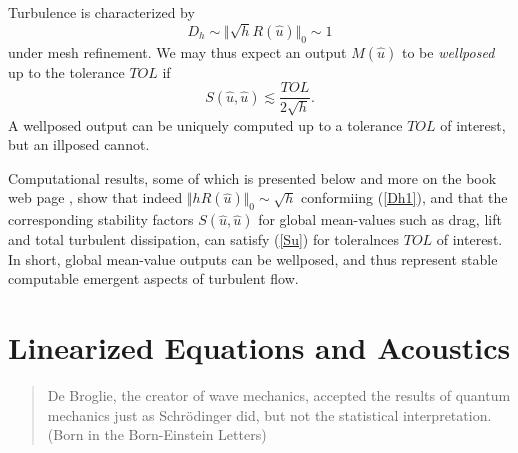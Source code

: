 Turbulence is characterized  by 
\begin{equation}\label{Dh1}
D_h\sim\Vert\sqrt{h} R(\hat u)\Vert_{0}\sim 1
\end{equation}
under mesh refinement. We may thus expect an output $M(\hat u)$ 
to be \emph{wellposed} up to the tolerance $TOL$ if 
\begin{equation}\label{Su}
S(\hat u,\hat u)\lesssim\frac{TOL}{2\sqrt{h}}.
\end{equation} 
A wellposed output can be uniquely computed up to a tolerance 
$TOL$ of interest,
but an illposed cannot.

Computational results, some of which
is presented below and more on the book web page
\cite{bodysoulmath}, show that indeed 
$\Vert hR(\hat u)\Vert_0\sim \sqrt{h}$ conformiing (\ref{Dh1}),
and that the corresponding stability factors $S(\hat u,\hat u)$
for global mean-values such as drag, lift and total turbulent 
dissipation, can satisfy (\ref{Su}) for toleralnces $TOL$
of interest. In short, global mean-value outputs
can be wellposed, and thus represent stable computable 
emergent aspects of turbulent flow.



\chapter{Linearized Equations and Acoustics}

\small
\begin{quote}
De Broglie, the creator of wave mechanics, accepted
the results of quantum mechanics just as Schr\"odinger did, but not
the statistical interpretation. (Born in the Born-Einstein Letters)
\end{quote}
\normalsize

